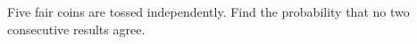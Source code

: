 Five fair coins are tossed independently. Find the probability that no two consecutive results agree.

